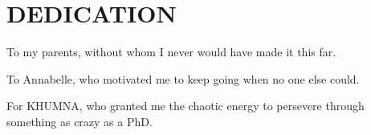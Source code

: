 %
%
%
%

\chapter*{DEDICATION}



\begin{center}
\vspace*{\fill}
To my parents, without whom I never would have made it this far.

To Annabelle, who motivated me to keep going when no one else could.

For KHUMNA, who granted me the chaotic energy to persevere through something as crazy as a PhD. 
\vspace*{\fill}
\end{center}

\pagebreak{}
